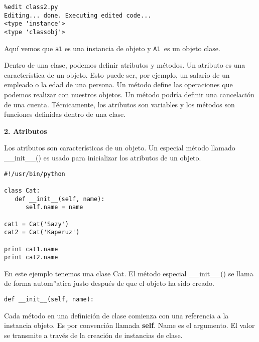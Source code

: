 \documentclass[twoside,10.5pt]{article}%
\begin{document}
\begin{verbatim}
%edit class2.py
Editing... done. Executing edited code...
<type 'instance'>
<type 'classobj'>
\end{verbatim}

\vspace{0.3cm}

Aqu\'i vemos que \texttt{a1} es una instancia de objeto  y \texttt{A1 }es un objeto clase.


Dentro de una clase, podemos definir  atributos y m\'etodos. Un atributo es una caracter\'istica de un objeto. Esto puede ser, por ejemplo, un salario de un empleado o la edad de una persona. Un m\'etodo define las operaciones que podemos realizar con nuestros objetos. Un método podría definir una cancelaci\'on de una cuenta. T\'ecnicamente, los atributos son variables y los  m\'etodos son funciones definidas dentro de una clase.

\vspace{0.3cm}

\textbf{2. Atributos}

Los atributos son caracter\'isticas de un objeto. Un especial m\'etodo llamado {\color{red}\_\_init\_\_()} es usado para inicializar los atributos de un objeto.

\vspace{0.3cm}

\begin{verbatim}
#!/usr/bin/python

class Cat:
   def __init__(self, name):
      self.name = name

cat1 = Cat('Sazy')
cat2 = Cat('Kaperuz')

print cat1.name
print cat2.name
\end{verbatim}

\vspace{0.3cm}

En este ejemplo tenemos una clase Cat. El m\'etodo especial {\color{red}\_\_init\_\_()} se llama de forma autom''atica justo despu\'es de que el objeto ha sido creado.


\begin{verbatim}
def __init__(self, name):
\end{verbatim}


\vspace{0.3cm}

Cada m\'etodo en una definici\'on de clase comienza con una referencia a la  instancia objeto. Es por convenci\'on llamada \textbf{self}. Name  es el argumento. El valor se transmite a trav\'es de la creaci\'on de instancias de clase.
\end{document}
